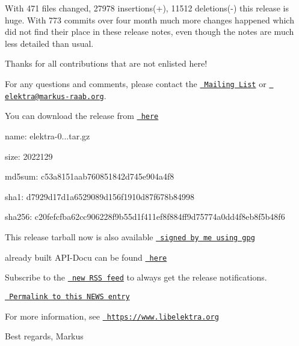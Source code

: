 With 471 files changed, 27978 insertions(+), 11512 deletions(-\/) this release is huge. With 773 commits over four month much more changes happened which did not find their place in these release notes, even though the notes are much less detailed than usual.

Thanks for all contributions that are not enlisted here!

For any questions and comments, please contact the \href{https://lists.sourceforge.net/lists/listinfo/registry-list}{\texttt{ Mailing List}} or \href{mailto:elektra@markus-raab.org}{\texttt{ elektra@markus-\/raab.\+org}}.

You can download the release from \href{http://www.markus-raab.org/ftp/elektra/releases/elektra-0.8.11.tar.gz}{\texttt{ here}}


\begin{DoxyItemize}
\item name\+: elektra-\/0...\+tar.\+gz
\item size\+: 2022129
\item md5sum\+: c53a8151aab760851842d745e904a4f8
\item sha1\+: d7929d17d1a6529089d156f1910d87f678b84998
\item sha256\+: c20fefcfba62cc906228f9b55d1f411ef8f884ff9d75774a0dd4f8eb8f5b48f6
\end{DoxyItemize}

This release tarball now is also available \href{http://www.markus-raab.org/ftp/elektra/releases/elektra-0.8.11.tar.gz.gpg}{\texttt{ signed by me using gpg}}

already built A\+P\+I-\/\+Docu can be found \href{https://doc.libelektra.org/api/0.8.11/html/}{\texttt{ here}}

Subscribe to the \href{https://doc.libelektra.org/news/feed.rss}{\texttt{ new R\+SS feed}} to always get the release notifications.

\href{https://doc.libelektra.org/news/7d4647d4-4131-411e-9c2a-2aca39446e18.html}{\texttt{ Permalink to this N\+E\+WS entry}}

For more information, see \href{https://www.libelektra.org}{\texttt{ https\+://www.\+libelektra.\+org}}

Best regards, Markus 